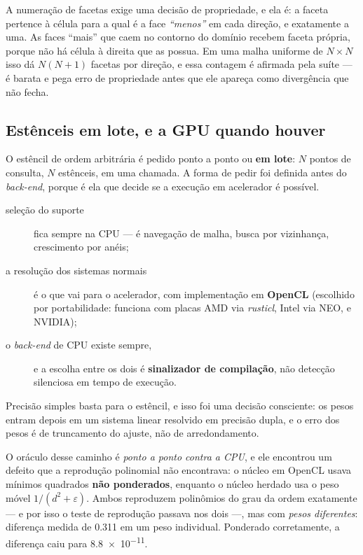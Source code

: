 A numeração de facetas exige uma decisão de propriedade, e ela é: a faceta
pertence à célula para a qual é a face \emph{``menos''} em cada direção, e
exatamente a uma. As faces ``mais'' que caem no contorno do domínio recebem
faceta própria, porque não há célula à direita que as possua. Em uma malha
uniforme de $N\times N$ isso dá $N(N+1)$ facetas por direção, e essa contagem é
afirmada pela suíte --- é barata e pega erro de propriedade antes que ele apareça
como divergência que não fecha.

\subsection{Estênceis em lote, e a GPU quando houver}
\label{sec:est-gpu}

O estêncil de ordem arbitrária é pedido ponto a ponto ou \textbf{em lote}: $N$
pontos de consulta, $N$ estênceis, em uma chamada. A forma de pedir foi definida
antes do \emph{back-end}, porque é ela que decide se a execução em acelerador é
possível.

\begin{description}
\item[seleção do suporte] fica sempre na CPU --- é navegação de malha, busca por
      vizinhança, crescimento por anéis;
\item[a resolução dos sistemas normais] é o que vai para o acelerador, com
      implementação em \textbf{OpenCL} (escolhido por portabilidade: funciona com
      placas AMD via \emph{rusticl}, Intel via NEO, e NVIDIA);
\item[o \emph{back-end} de CPU existe sempre,] e a escolha entre os dois é
      \textbf{sinalizador de compilação}, não detecção silenciosa em tempo de
      execução.
\end{description}

Precisão simples basta para o estêncil, e isso foi uma decisão consciente: os
pesos entram depois em um sistema linear resolvido em precisão dupla, e o erro
dos pesos é de truncamento do ajuste, não de arredondamento.

O oráculo desse caminho é \emph{ponto a ponto contra a CPU}, e ele encontrou um
defeito que a reprodução polinomial não encontrava: o núcleo em OpenCL usava
mínimos quadrados \textbf{não ponderados}, enquanto o núcleo herdado usa o peso
móvel $1/(d^2+\varepsilon)$. Ambos reproduzem polinômios do grau da ordem
exatamente --- e por isso o teste de reprodução passava nos dois ---, mas com
\emph{pesos diferentes}: diferença medida de \num{0.311} em um peso individual.
Ponderado corretamente, a diferença caiu para \num{8.8e-11}.

